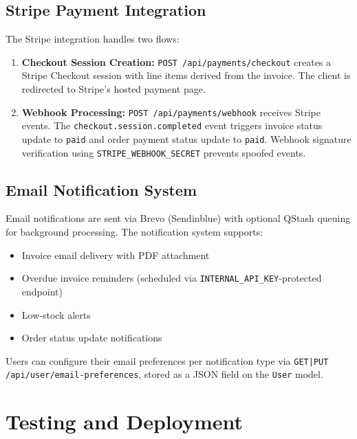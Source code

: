 ﻿\documentclass[12pt,a4paper]{report}
\begin{document}
\section{Stripe Payment Integration}

The Stripe integration handles two flows:

\begin{enumerate}[leftmargin=1.5em]
  \item \textbf{Checkout Session Creation:} \texttt{POST /api/payments/checkout} creates a Stripe Checkout session with line items derived from the invoice. The client is redirected to Stripe's hosted payment page.
  \item \textbf{Webhook Processing:} \texttt{POST /api/payments/webhook} receives Stripe events. The \texttt{checkout.session.completed} event triggers invoice status update to \texttt{paid} and order payment status update to \texttt{paid}. Webhook signature verification using \texttt{STRIPE\_WEBHOOK\_SECRET} prevents spoofed events.
\end{enumerate}

\section{Email Notification System}

Email notifications are sent via Brevo (Sendinblue) with optional QStash queuing for background processing. The notification system supports:
\begin{itemize}[leftmargin=1.5em]
  \item Invoice email delivery with PDF attachment
  \item Overdue invoice reminders (scheduled via \texttt{INTERNAL\_API\_KEY}-protected endpoint)
  \item Low-stock alerts
  \item Order status update notifications
\end{itemize}

Users can configure their email preferences per notification type via \texttt{GET|PUT /api/user/email-preferences}, stored as a JSON field on the \texttt{User} model.

\chapter{Testing and Deployment}
\end{document}
